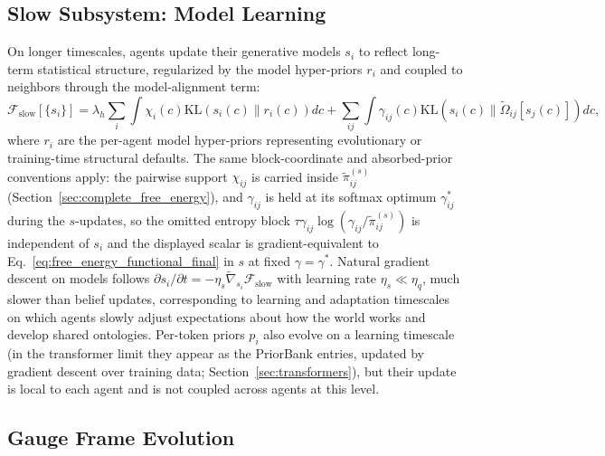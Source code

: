 \documentclass[11pt]{article}
\begin{document}
\subsection{Slow Subsystem: Model Learning}

On longer timescales, agents update their generative models $s_i$ to reflect long-term statistical structure, regularized by the model hyper-priors $r_i$ and coupled to neighbors through the model-alignment term:
\begin{equation}
\mathcal{F}_{\text{slow}}[\{s_i\}] = \lambda_h \sum_i \int \chi_i(c)  \mathrm{KL}(s_i(c) \| r_i(c))  dc
+ \sum_{ij} \int \gamma_{ij}(c)  \mathrm{KL}(s_i(c) \| \tilde{\Omega}_{ij}[s_j(c)])  dc,
\end{equation}
where $r_i$ are the per-agent model hyper-priors representing evolutionary or training-time structural defaults. The same block-coordinate and absorbed-prior conventions apply: the pairwise support $\chi_{ij}$ is carried inside $\tilde{\pi}^{(s)}_{ij}$ (Section~\ref{sec:complete_free_energy}), and $\gamma_{ij}$ is held at its softmax optimum $\gamma^*_{ij}$ during the $s$-updates, so the omitted entropy block $\tau\gamma_{ij}\log(\gamma_{ij}/\tilde{\pi}^{(s)}_{ij})$ is independent of $s_i$ and the displayed scalar is gradient-equivalent to Eq.~\eqref{eq:free_energy_functional_final} in $s$ at fixed $\gamma = \gamma^*$. Natural gradient descent on models follows $\partial s_i/\partial t = -\eta_s  \tilde{\nabla}_{s_i} \mathcal{F}_{\text{slow}}$ with learning rate $\eta_s \ll \eta_q$, much slower than belief updates, corresponding to learning and adaptation timescales on which agents slowly adjust expectations about how the world works and develop shared ontologies. Per-token priors $p_i$ also evolve on a learning timescale (in the transformer limit they appear as the PriorBank entries, updated by gradient descent over training data; Section~\ref{sec:transformers}), but their update is local to each agent and is not coupled across agents at this level.

\subsection{Gauge Frame Evolution}
\end{document}
